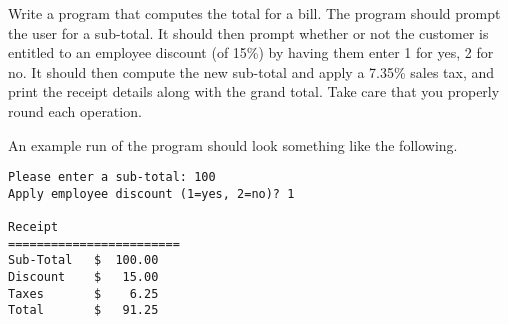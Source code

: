 \begin{exer}
Write a program that computes the total for a bill.  The program should prompt the user for a 
sub-total.  It should then prompt whether or not the customer is entitled to an employee discount (of 15\%) by 
having them enter 1 for yes, 2 for no.  It should then compute the new sub-total and apply a 7.35\% sales tax, and
print the receipt details along with the grand total.  Take care that you properly round each operation.

An example run of the program should look something like the following.

\begin{verbatim}
Please enter a sub-total: 100
Apply employee discount (1=yes, 2=no)? 1

Receipt
========================
Sub-Total   $  100.00
Discount    $   15.00
Taxes       $    6.25
Total       $   91.25
\end{verbatim}
\end{exer}



